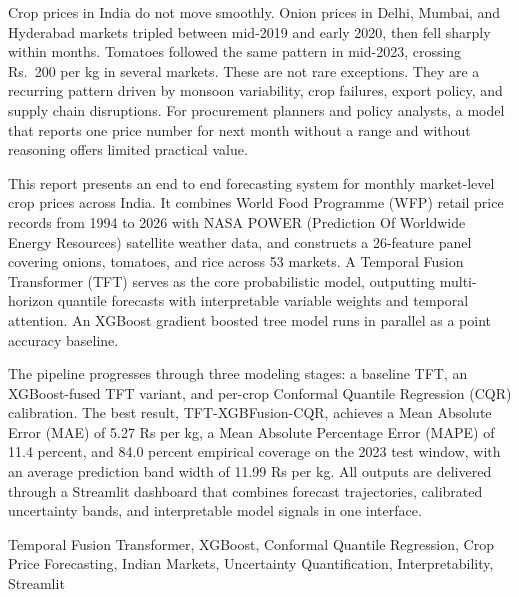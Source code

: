 \documentclass[12pt,a4paper]{report}
\begin{document}
Crop prices in India do not move smoothly. Onion prices in Delhi, Mumbai, and Hyderabad
markets tripled between mid-2019 and early 2020, then fell sharply within months. Tomatoes
followed the same pattern in mid-2023, crossing Rs.\ 200 per kg in several markets. These
are not rare exceptions. They are a recurring pattern driven by monsoon variability, crop
failures, export policy, and supply chain disruptions. For procurement planners and policy
analysts, a model that reports one price number for next month without a range and without
reasoning offers limited practical value.

This report presents an end to end forecasting system for monthly market-level crop prices
across India. It combines World Food Programme (WFP) retail price records from 1994 to 2026
with NASA POWER (Prediction Of Worldwide Energy Resources) satellite weather data, and
constructs a 26-feature panel covering onions, tomatoes, and rice across 53 markets. A
Temporal Fusion Transformer (TFT) serves as the core probabilistic model, outputting
multi-horizon quantile forecasts with interpretable variable weights and temporal attention.
An XGBoost gradient boosted tree model runs in parallel as a point accuracy baseline.

The pipeline progresses through three modeling stages: a baseline TFT, an XGBoost-fused
TFT variant, and per-crop Conformal Quantile Regression (CQR) calibration. The best
result, TFT-XGBFusion-CQR, achieves a Mean Absolute Error (MAE) of 5.27 Rs per kg, a Mean
Absolute Percentage Error (MAPE) of 11.4 percent, and 84.0 percent empirical coverage on
the 2023 test window, with an average prediction band width of 11.99 Rs per kg. All outputs
are delivered through a Streamlit dashboard that combines forecast trajectories, calibrated
uncertainty bands, and interpretable model signals in one interface.

\vspace{1cm}
\noindent Temporal Fusion Transformer, XGBoost, Conformal Quantile Regression, Crop Price
Forecasting, Indian Markets, Uncertainty Quantification, Interpretability, Streamlit

\clearpage

\tableofcontents
\clearpage
\listoffigures
\clearpage
\listoftables
\clearpage

\hypersetup{pageanchor=true}
\end{document}
